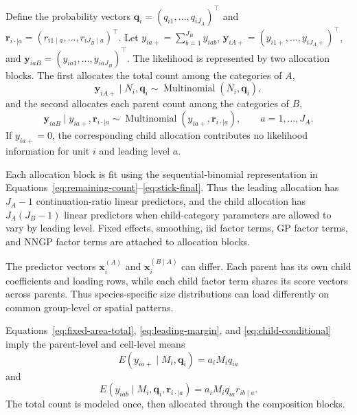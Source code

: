 \documentclass[11pt]{article}
\newcommand{\bq}{\bm{q}}
\newcommand{\br}{\bm{r}}
\newcommand{\bx}{\bm{x}}
\newcommand{\by}{\bm{y}}
\newcommand{\trans}{^\top}
\newcommand{\Mult}{\operatorname{Multinomial}}
\begin{document}
Define the probability vectors
\(\bq_i=(q_{i1},\ldots,q_{iJ_A})\trans\) and
\(\br_{i\cdot\mid a}=(r_{i1\mid a},\ldots,r_{iJ_B\mid a})\trans\).
Let \(y_{ia+}=\sum_{b=1}^{J_B}y_{iab}\),
\(\by_{iA+}=(y_{i1+},\ldots,y_{iJ_A+})\trans\), and
\(\by_{iaB}=(y_{ia1},\ldots,y_{iaJ_B})\trans\).
The likelihood is represented by two allocation blocks. The first allocates
the total count among the categories of \(A\),
\begin{equation}
  \by_{iA+}\mid N_i,\bq_i
  \sim
  \Mult(N_i,\bq_i),
  \label{eq:leading-margin}
\end{equation}
and the second allocates each parent count among the categories of \(B\),
\begin{equation}
  \by_{iaB}\mid y_{ia+},\br_{i\cdot\mid a}
  \sim
  \Mult(y_{ia+},\br_{i\cdot\mid a}),
  \qquad
  a=1,\ldots,J_A.
  \label{eq:child-conditional}
\end{equation}
If \(y_{ia+}=0\), the corresponding child allocation contributes no likelihood
information for unit \(i\) and leading level \(a\).

Each allocation block is fit using the sequential-binomial representation in
Equations~\ref{eq:remaining-count}--\ref{eq:stick-final}. Thus the leading
allocation has \(J_A-1\) continuation-ratio linear predictors, and the child
allocation has \(J_A(J_B-1)\) linear predictors when child-category parameters
are allowed to vary by leading level. Fixed effects, smoothing, iid factor
terms, GP factor terms, and NNGP factor terms are attached to allocation
blocks.

The predictor vectors \(\bx_i^{(A)}\) and \(\bx_i^{(B\mid A)}\) can differ.
Each parent has its own child coefficients and loading rows, while each child
factor term shares its score vectors across parents. Thus species-specific
size distributions can load
differently on common group-level or spatial patterns.

Equations~\ref{eq:fixed-area-total}, \ref{eq:leading-margin}, and
\ref{eq:child-conditional} imply the parent-level and cell-level means
\begin{equation}
  E(y_{ia+}\mid M_i,\bq_i)=a_iM_iq_{ia}
  \label{eq:implied-parent-mean}
\end{equation}
and
\begin{equation}
  E(y_{iab}\mid M_i,\bq_i,\br_{i\cdot\mid a})=a_iM_iq_{ia}r_{ib\mid a}.
  \label{eq:implied-cell-mean}
\end{equation}
The total count is modeled once, then allocated through the composition blocks.
\end{document}
